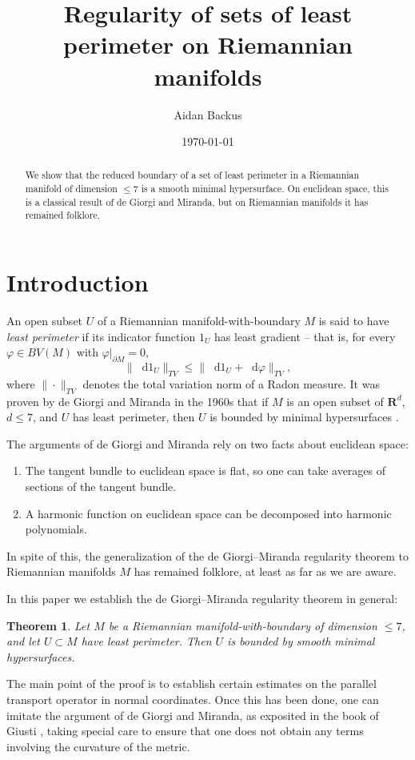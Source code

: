 \documentclass[reqno,11pt]{amsart}
\title{Regularity of sets of least perimeter on Riemannian manifolds}
\author{Aidan Backus}
\date{\today}
\newcommand{\RR}{\mathbf{R}}
\newcommand*\dif{\mathop{}\!\mathrm{d}}
\newcommand{\dfn}[1]{\emph{#1}\index{#1}}
\newtheorem{theorem}{Theorem}[section]
\theoremstyle{definition}
\numberwithin{equation}{section}
\begin{document}
\begin{abstract}
    We show that the reduced boundary of a set of least perimeter in a Riemannian manifold of dimension $\leq 7$ is a smooth minimal hypersurface.
    On euclidean space, this is a classical result of de Giorgi and Miranda, but on Riemannian manifolds it has remained folklore.
\end{abstract}

\maketitle

\section{Introduction}
An open subset $U$ of a Riemannian manifold-with-boundary $M$ is said to have \dfn{least perimeter} if its indicator function $1_U$ has least gradient -- that is, for every $\varphi \in BV(M)$ with $\varphi|_{\partial M} = 0$, 
$$\|\dif 1_U\|_{TV} \leq \|\dif 1_U + \dif \varphi\|_{TV},$$
where $\|\cdot\|_{TV}$ denotes the total variation norm of a Radon measure.
It was proven by de Giorgi and Miranda in the 1960s that if $M$ is an open subset of $\RR^d$, $d \leq 7$, and $U$ has least perimeter, then $U$ is bounded by minimal hypersurfaces \cite{deGiorgi61, Miranda66}.

The arguments of de Giorgi and Miranda rely on two facts about euclidean space:
\begin{enumerate}
\item The tangent bundle to euclidean space is flat, so one can take averages of sections of the tangent bundle.
\item A harmonic function on euclidean space can be decomposed into harmonic polynomials.
\end{enumerate}
In spite of this, the generalization of the de Giorgi--Miranda regularity theorem to Riemannian manifolds $M$ has remained folklore, at least as far as we are aware.

In this paper we establish the de Giorgi--Miranda regularity theorem in general:

\begin{theorem}\label{main thm}
Let $M$ be a Riemannian manifold-with-boundary of dimension $\leq 7$, and let $U \subset M$ have least perimeter.
Then $U$ is bounded by smooth minimal hypersurfaces.
\end{theorem}

The main point of the proof is to establish certain estimates on the parallel transport operator in normal coordinates.
Once this has been done, one can imitate the argument of de Giorgi and Miranda, as exposited in the book of Giusti \cite{Giusti77}, taking special care to ensure that one does not obtain any terms involving the curvature of the metric.
\end{document}
